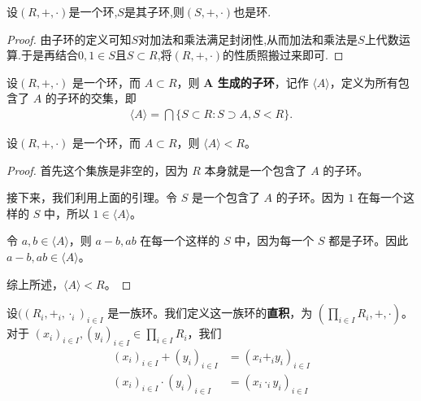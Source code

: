 \documentclass[../../main.tex]{subfiles}
\begin{document}
\begin{proposition}[子环仍是环]\label{proposition:子环仍是环}
设$(R,+,\cdot)$是一个环,$S$是其子环,则$(S,+,\cdot)$也是环.
\end{proposition}
\begin{proof}
由子环的定义可知$S$对加法和乘法满足封闭性,从而加法和乘法是$S$上代数运算.于是再结合$0,1\in S$且$S\subset R$,将$(R,+,\cdot)$的性质照搬过来即可.
\end{proof}

\begin{definition}[由子集生成的子环]
设$(R, +, \cdot)$ 是一个环，而 $A \subset R$，则 \textbf{$\boldsymbol{A}$ 生成的子环}，记作 $\langle A\rangle$，定义为所有包含了 $A$ 的子环的交集，即
\begin{align*}
\langle A\rangle = \bigcap \{S \subset R : S \supset A, S < R\} .
\end{align*}
\end{definition}

\begin{proposition}[由子集生成的子环仍是子环]\label{proposition:生成的子环仍是子环}
设$(R, +, \cdot)$ 是一个环，而 $A \subset R$，则 $\langle A\rangle < R$。
\end{proposition}
\begin{proof}
首先这个集族是非空的，因为 $R$ 本身就是一个包含了 $A$ 的子环。

接下来，我们利用上面的引理。令 $S$ 是一个包含了 $A$ 的子环。因为 $1$ 在每一个这样的 $S$ 中，所以 $1 \in \langle A\rangle$。

令 $a, b \in \langle A\rangle$，则 $a - b, ab$ 在每一个这样的 $S$ 中，因为每一个 $S$ 都是子环。因此 $a - b, ab \in \langle A\rangle$。

综上所述，$\langle A\rangle < R$。
\end{proof}

\begin{definition}[环的直积]
设$((R_i, +_i, \cdot_i)_{i \in I}$ 是一族环。我们定义这一族环的\textbf{直积}，为 $(\prod_{i \in I} R_i, +, \cdot)$。对于 $(x_i)_{i \in I}, (y_i)_{i \in I} \in \prod_{i \in I} R_i$，我们
\begin{align}
(x_i)_{i \in I} + (y_i)_{i \in I} &= (x_i +_i y_i)_{i \in I} \label{eq:2.23}\\
(x_i)_{i \in I} \cdot (y_i)_{i \in I} &= (x_i \cdot_i y_i)_{i \in I} \label{eq:2.24}
\end{align}
\end{definition}
\end{document}
